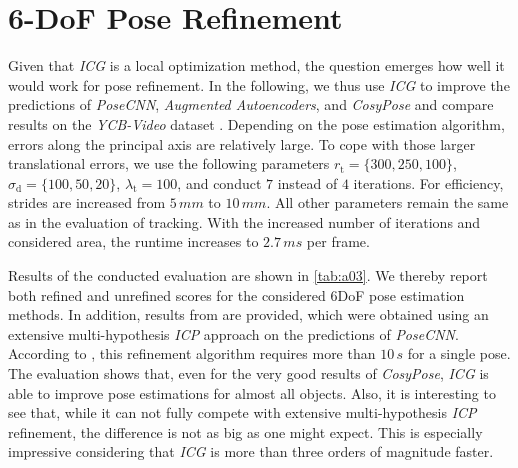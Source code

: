 \documentclass[10pt,twocolumn,letterpaper]{article}
\begin{document}
\section{6-DoF Pose Refinement}\label{sec:a4}
Given that \textit{ICG} is a local optimization method, the question emerges how well it would work for pose refinement.
In the following, we thus use \textit{ICG} to improve the predictions of \textit{PoseCNN}, \textit{Augmented Autoencoders}, and \textit{CosyPose} and compare results on the \textit{YCB-Video} dataset \cite{Xiang2018}.
Depending on the pose estimation algorithm, errors along the principal axis are relatively large.
To cope with those larger translational errors, we use the following parameters $r_\textrm{t} = \{300, 250, 100\}$, $\sigma_\textrm{d} = \{100, 50, 20\}$, $\lambda_\textrm{t} = 100$, and conduct $7$ instead of $4$ iterations.
For efficiency, strides are increased from $5\,\unit{mm}$ to $10\,\unit{mm}$.
All other parameters remain the same as in the evaluation of tracking.
With the increased number of iterations and considered area, the runtime increases to $2.7\,\unit{ms}$ per frame.

Results of the conducted evaluation are shown in \cref{tab:a03}.
We thereby report both refined and unrefined scores for the considered \acs{6DoF} pose estimation methods.
In addition, results from \cite{Xiang2018} are provided, which were obtained using an extensive multi-hypothesis \textit{ICP} approach on the predictions of \textit{PoseCNN}.
According to \cite{Wang2019b}, this refinement algorithm requires more than $10\,\unit{s}$ for a single pose.
The evaluation shows that, even for the very good results of \textit{CosyPose}, \textit{ICG} is able to improve pose estimations for almost all objects.
Also, it is interesting to see that, while it can not fully compete with extensive multi-hypothesis \textit{ICP} refinement, the difference is not as big as one might expect.
This is especially impressive considering that \textit{ICG} is more than three orders of magnitude faster.
\end{document}
